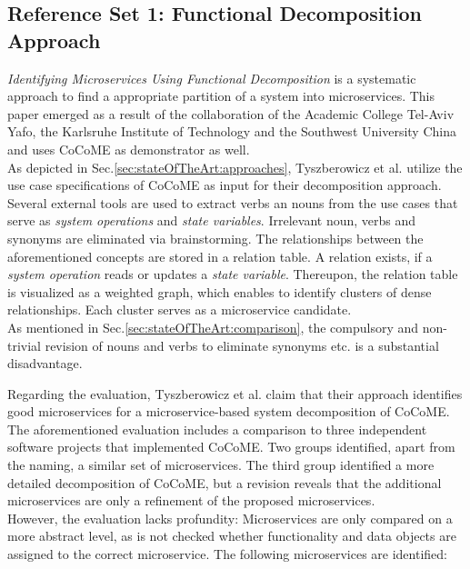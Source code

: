 \subsection{Reference Set 1: Functional Decomposition Approach}
\textit{Identifying Microservices Using Functional Decomposition} \cite{FunctionalDecompositionHeinrich} is a systematic approach to find a appropriate partition of a system into microservices. This paper emerged as a result of the collaboration of the Academic College Tel-Aviv Yafo, the Karlsruhe Institute of Technology and the Southwest University China and uses CoCoME as demonstrator as well.\\
As depicted in Sec.\ref{sec:stateOfTheArt:approaches}, Tyszberowicz et al. utilize the use case specifications of CoCoME \cite{CoCoMEOld} as input for their decomposition approach. Several external tools are used to extract verbs an nouns from the use cases that serve as \textit{system operations} and \textit{state variables}. Irrelevant noun, verbs and synonyms are eliminated via brainstorming. The relationships between the aforementioned concepts are stored in a relation table. A relation exists, if a \textit{system operation} reads or updates a \textit{state variable}. Thereupon, the relation table is visualized as a weighted graph, which enables to identify clusters of dense relationships. Each cluster serves as a microservice candidate.\\
As mentioned in Sec.\ref{sec:stateOfTheArt:comparison}, the compulsory and non-trivial revision of nouns and verbs to eliminate synonyms etc. is a substantial disadvantage. 


Regarding the evaluation, Tyszberowicz et al. claim that their approach identifies good microservices for a microservice-based system decomposition of CoCoME. The aforementioned evaluation includes a comparison to three independent software projects that implemented CoCoME. Two groups identified, apart from the naming, a similar set of microservices. The third group identified a more detailed decomposition of CoCoME, but a revision reveals that the additional microservices are only a refinement of the proposed microservices. \\
However, the evaluation lacks profundity: Microservices are only compared on a more abstract level, as is not checked whether functionality and data objects are assigned to the correct microservice. The following microservices are identified: 




